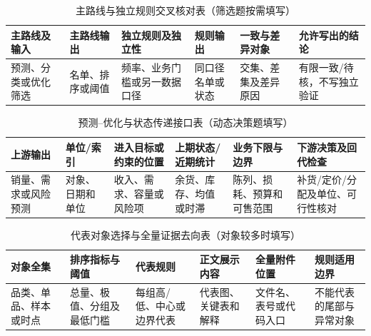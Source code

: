 \documentclass[withoutpreface,bwprint]{cumcmthesis}
\begin{document}
  \begin{table}[H]
    \centering
    \small
    \setlength{\tabcolsep}{3.2pt}
    \caption{主路线与独立规则交叉核对表（筛选题按需填写）}
    \label{tab:independent-screening-crosscheck-guide}
    \begin{tabular}{p{2.05cm}p{2.15cm}p{2.15cm}p{2.25cm}p{2.25cm}p{2.35cm}}
      \toprule
      主路线及输入 & 主路线输出 & 独立规则及独立性 & 规则输出 & 一致与差异对象 & 允许写出的结论 \\
      \midrule
      预测、分类或优化筛选 & 名单、排序或阈值 & 频率、业务门槛或另一数据口径 & 同口径名单或状态 & 交集、差集及差异原因 & 有限一致/待核，不写独立验证 \\
      \bottomrule
    \end{tabular}
  \end{table}
  \begin{table}[H]
    \centering
    \small
    \setlength{\tabcolsep}{3.2pt}
    \caption{预测--优化与状态传递接口表（动态决策题填写）}
    \label{tab:forecast-optimization-state-interface-guide}
    \begin{tabular}{p{1.85cm}p{1.8cm}p{2.25cm}p{2.25cm}p{2.35cm}p{2.6cm}}
      \toprule
      上游输出 & 单位/索引 & 进入目标或约束的位置 & 上期状态/近期统计 & 业务下限与边界 & 下游决策及回代检查 \\
      \midrule
      销量、需求或风险预测 & 对象、日期和单位 & 收入、需求、容量或风险项 & 余货、库存、均值或时滞 & 陈列、损耗、预算和可售范围 & 补货/定价/分配及单位、可行性核对 \\
      \bottomrule
    \end{tabular}
  \end{table}
  \begin{table}[H]
    \centering
    \small
    \setlength{\tabcolsep}{3.5pt}
    \caption{代表对象选择与全量证据去向表（对象较多时填写）}
    \label{tab:representative-selection-appendix-guide}
    \begin{tabular}{p{1.9cm}p{2.35cm}p{2.05cm}p{2.25cm}p{2.1cm}p{2.25cm}}
      \toprule
      对象全集 & 排序指标与阈值 & 代表规则 & 正文展示内容 & 全量附件位置 & 规则适用边界 \\
      \midrule
      品类、单品、样本或时点 & 总量、极值、分组及最低门槛 & 每组高/低、中心或边界代表 & 代表图、关键表和解释 & 文件名、表号或代码入口 & 不能代表的尾部与异常对象 \\
      \bottomrule
    \end{tabular}
  \end{table}
\end{document}
